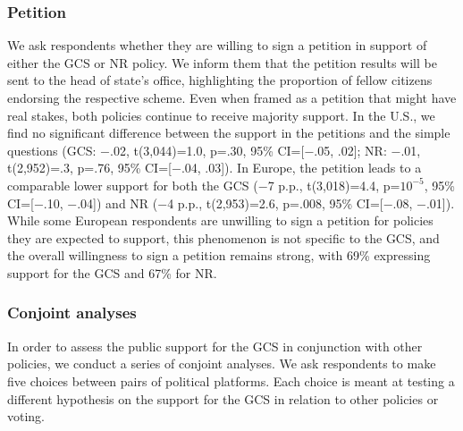 \begin{bibunit}
\subsubsection{Petition}\label{subsubsec:petition} %

We ask respondents whether they are willing to sign a petition in support of either the GCS or NR policy. We inform them that the petition results will be sent to the head of state's office, highlighting the proportion of fellow citizens endorsing the respective scheme. Even when framed as a petition that might have real stakes, both policies continue to receive majority support. In the U.S., we find no significant difference between the support in the %
petitions and the simple questions (GCS: $-$.02, t(3,044)=1.0, p=.30, 95\% CI=[$-$.05, .02]; NR: $-$.01, t(2,952)=.3, p=.76, 95\% CI=[$-$.04, .03]). 
In Europe, the petition leads to a comparable lower support for both the GCS ($-$7 p.p., t(3,018)=4.4, p=$10^{-5}$, 95\% CI=[$-$.10, $-$.04]) and NR ($-$4 p.p., t(2,953)=2.6, p=.008, 95\% CI=[$-$.08, $-$.01]). 
While some European respondents are unwilling to sign a petition for policies they are expected to support, this phenomenon is not specific to the GCS, and the overall willingness to sign a %
petition remains strong, with 69\% expressing support for the GCS and 67\% for NR.

\subsubsection{Conjoint analyses}\label{subsubsec:conjoint} %

In order to assess the public support for the GCS in conjunction with other policies, we conduct a series of conjoint analyses. We ask respondents to make five choices between pairs of political platforms. Each choice is meant at testing a different hypothesis on the support for the GCS in relation to other policies or voting.


\end{bibunit}
